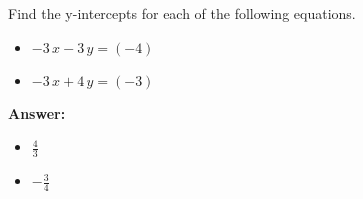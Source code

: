  Find the y-intercepts for each of the following equations. \begin{itemize}\item \( -3 \, x - 3 \, y = \left(-4\right) \)\item \( -3 \, x + 4 \, y = \left(-3\right) \)\end{itemize}

        \textbf{Answer:} \begin{itemize}\item \( \frac{4}{3} \)\item \( -\frac{3}{4} \)\end{itemize}
